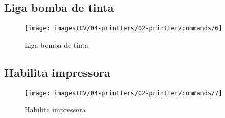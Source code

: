 \subsection{Liga bomba de tinta}
\begin{figure}
    \centering
    \texttt{[image: imagesICV/04-printters/02-printter/commands/6]}
    \caption{Liga bomba de tinta}
\end{figure}
\newpage
\thispagestyle{fancy}
\vspace{\fill}

\subsection{Habilita impressora}
\begin{figure}
    \centering
    \texttt{[image: imagesICV/04-printters/02-printter/commands/7]}
    \caption{Habilita impressora}
\end{figure}
